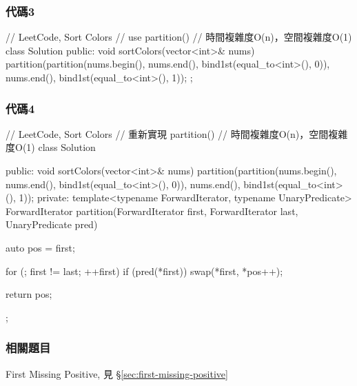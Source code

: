 \subsubsection{代碼3}
\begin{Code}
// LeetCode, Sort Colors
// use partition()
// 時間複雜度O(n)，空間複雜度O(1)
class Solution {
public:
    void sortColors(vector<int>& nums) {
        partition(partition(nums.begin(), nums.end(), bind1st(equal_to<int>(), 0)),
                nums.end(), bind1st(equal_to<int>(), 1));
    }
};
\end{Code}


\subsubsection{代碼4}
\begin{Code}
// LeetCode, Sort Colors
// 重新實現 partition()
// 時間複雜度O(n)，空間複雜度O(1)
class Solution {
public:
    void sortColors(vector<int>& nums) {
        partition(partition(nums.begin(), nums.end(), bind1st(equal_to<int>(), 0)),
                 nums.end(), bind1st(equal_to<int>(), 1));
    }
private:
    template<typename ForwardIterator, typename UnaryPredicate>
    ForwardIterator partition(ForwardIterator first, ForwardIterator last,
            UnaryPredicate pred) {
        auto pos = first;

        for (; first != last; ++first)
            if (pred(*first))
                swap(*first, *pos++);

        return pos;
    }
};
\end{Code}


\subsubsection{相關題目}
\begindot
\item First Missing Positive, 見 \S \ref{sec:first-missing-positive}
\myenddot
